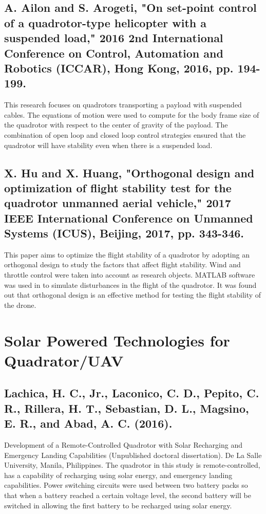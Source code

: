 \subsection{A. Ailon and S. Arogeti, "On set-point control of a quadrotor-type helicopter with a suspended load," 2016 2nd International Conference on Control, Automation and Robotics (ICCAR), Hong Kong, 2016, pp. 194-199.}
This research focuses on quadrotors transporting a payload with suspended cables. The equations of motion were used to compute for the body frame size of the quadrotor with respect to the center of gravity of the payload. The combination of open loop and closed loop control strategies ensured that the quadrotor will have stability even when there is a suspended load.

\subsection{X. Hu and X. Huang, "Orthogonal design and optimization of flight stability test for the quadrotor unmanned aerial vehicle," 2017 IEEE International Conference on Unmanned Systems (ICUS), Beijing, 2017, pp. 343-346.}
This paper aims to optimize the flight stability of a quadrotor by adopting an orthogonal design to study the factors that affect flight stability. Wind and throttle control were taken into account as research objects. MATLAB software was used in to simulate disturbances in the flight of the quadrotor. It was found out that orthogonal design is an effective method for testing the flight stability of the drone.

\section{Solar Powered Technologies for Quadrator/UAV}
\subsection{Lachica, H. C., Jr., Laconico, C. D., Pepito, C. R., Rillera, H. T., Sebastian, D. L., Magsino, E. R., and Abad, A. C. (2016).}
Development of a Remote-Controlled Quadrotor with Solar Recharging and Emergency Landing Capabilities (Unpublished doctoral dissertation). De La Salle University, Manila, Philippines. The quadrotor in this study is remote-controlled, has a capability of recharging using solar energy, and emergency landing capabilities. Power switching circuits were used between two battery packs so that when a battery reached a certain voltage level, the second battery will be switched in allowing the first battery to be recharged using solar energy.

